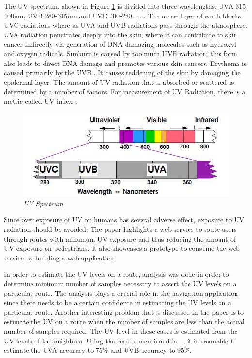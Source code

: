 \documentclass[10pt]{sigplan-proc-varsize}
\begin{document}
The UV spectrum, shown in Figure \ref{fig:uvSpectrum} is divided into three wavelengths: UVA 315-400nm, UVB 280-315nm and UVC 200-280nm \cite{dep4}. The ozone layer of earth blocks UVC radiations where as UVA and UVB radiations pass through the atmosphere. UVA radiation penetrates deeply into the skin, where it can contribute to skin cancer indirectly via generation of DNA-damaging molecules such as hydroxyl and oxygen radicals. Sunburn is caused by too much UVB radiation; this form also leads to direct DNA damage and promotes various skin cancers. Erythema is caused primarily by the UVB \cite{dep3}. It causes reddening of the skin by damaging the epidermal layer. The amount of UV radiation that is absorbed or scattered is determined by a number of factors. For measurement of UV Radiation, there is a metric called UV index \cite{dep5}. 
\begin{figure}
\begin{center}
\includegraphics[scale=0.40]{uvSpectrum.png}
\caption{\small \sl UV Spectrum\label{fig:uvSpectrum}}
\end{center}
\end{figure}


Since over exposure of UV on humans has several adverse effect, exposure to UV radiation should be avoided. The paper highlights a web service to route users through routes with minumum UV exposure and thus reducing the amount of UV exposure on pedestrians. It also showcases a prototype to consume the web service by building a web application. 

In order to estimate the UV levels on a route, analysis was done in order to determine minimum number of samples necessary to assert the UV levels on a particular route. The analysis plays a crucial role in the navigation application since there needs to be a certain confidence in estimating the UV levels on a particular route. Another interesting problem that is discussed in the paper is to estimate the UV on a route when the number of samples are less than the actual number of samples required. The UV level in these cases is estimated from the UV levels of the neighbors. Using the results mentioned in ~\cite{uvguardian}, it is resonable to estimate the UVA accuracy to 75\% and UVB accuracy to 95\%. 
\end{document}
